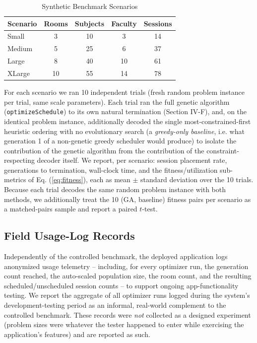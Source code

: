 \documentclass[conference]{IEEEtran}
\begin{document}
\begin{table}[t]
\caption{Synthetic Benchmark Scenarios}
\label{tab:scenarios}
\centering
\begin{tabular}{lcccc}
\toprule
Scenario & Rooms & Subjects & Faculty & Sessions \\
\midrule
Small  & 3  & 10 & 3  & 14 \\
Medium & 5  & 25 & 6  & 37 \\
Large  & 8  & 40 & 10 & 61 \\
XLarge & 10 & 55 & 14 & 78 \\
\bottomrule
\end{tabular}
\end{table}

For each scenario we ran 10 independent trials (fresh random problem instance per trial, same scale parameters). Each trial ran the full genetic algorithm (\texttt{optimizeSchedule}) to its own natural termination (Section IV-F), and, on the identical problem instance, additionally decoded the single most-constrained-first heuristic ordering with no evolutionary search (a \emph{greedy-only baseline}, i.e. what generation 1 of a non-genetic greedy scheduler would produce) to isolate the contribution of the genetic algorithm from the contribution of the constraint-respecting decoder itself. We report, per scenario: session placement rate, generations to termination, wall-clock time, and the fitness/utilization sub-metrics of Eq. (\ref{eq:fitness}), each as mean $\pm$ standard deviation over the 10 trials. Because each trial decodes the same random problem instance with both methods, we additionally treat the 10 (GA, baseline) fitness pairs per scenario as a matched-pairs sample and report a paired $t$-test.

\subsection{Field Usage-Log Records}
Independently of the controlled benchmark, the deployed application logs anonymized usage telemetry -- including, for every optimizer run, the generation count reached, the auto-scaled population size, the room count, and the resulting scheduled/unscheduled session counts -- to support ongoing app-functionality testing. We report the aggregate of all optimizer runs logged during the system's development-testing period as an informal, real-world complement to the controlled benchmark. These records were \emph{not} collected as a designed experiment (problem sizes were whatever the tester happened to enter while exercising the application's features) and are reported as such.
\end{document}
